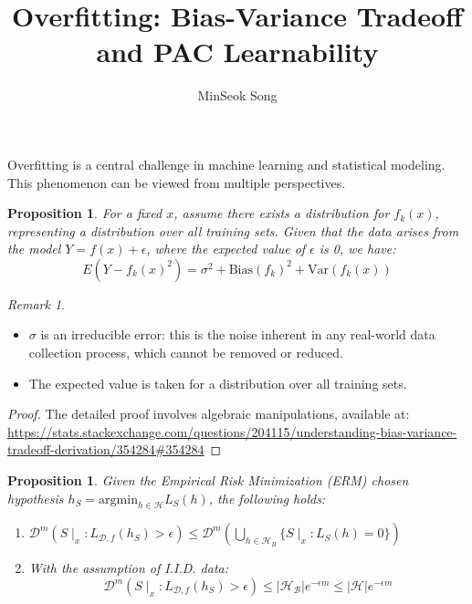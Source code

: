 \documentclass{article}
\newtheorem{proposition}[theorem]{Proposition}
\theoremstyle{remark}
\newtheorem{remark}[example]{Remark}
\begin{document}
\title{Overfitting: Bias-Variance Tradeoff and PAC Learnability}
\author{MinSeok Song}
\date{}
\maketitle
Overfitting is a central challenge in machine learning and statistical modeling. This phenomenon can be viewed from multiple perspectives.
\begin{proposition}
For a fixed $x$, assume there exists a distribution for $f_k(x)$, representing a distribution over all training sets. Given that the data arises from the model $Y=f(x)+\epsilon$, where the expected value of $\epsilon$ is 0, we have:
\[E(Y-f_k(x)^2) = \sigma^2 + \text{Bias}(f_k)^2 + \text{Var}(f_k(x))\]
\end{proposition}
\begin{remark}
\begin{itemize}
\item $\sigma$ is an irreducible error: this is the noise inherent in any real-world data collection process, which cannot be removed or reduced.
\item The expected value is taken for a distribution over all training sets.
\end{itemize}
\end{remark}

\begin{proof}
The detailed proof involves algebraic manipulations, available at:
\url{https://stats.stackexchange.com/questions/204115/understanding-bias-variance-tradeoff-derivation/354284#354284}
\end{proof}

\begin{proposition}
Given the Empirical Risk Minimization (ERM) chosen hypothesis $h_S = \text{argmin}_{h\in\mathcal{H}}L_{S}(h)$, the following holds:
\begin{enumerate}
    \item $\mathcal{D}^m\left(S\mid_x:L_{\mathcal{D}, f}(h_S)>\epsilon\right) \leq \mathcal{D}^m\left(\bigcup_{h\in \mathcal{H}_B}\{S\mid_x:L_S(h)=0\}\right)$
    
    \item With the assumption of I.I.D. data:
    \[\mathcal{D}^m\left(S\mid_x:L_{\mathcal{D}, f}(h_S)>\epsilon\right) \leq \lvert \mathcal{H_B}\rvert e^{-\epsilon m} \leq \lvert \mathcal{H}\rvert e^{-\epsilon m}\]
\end{enumerate}
\end{proposition}
\end{document}
